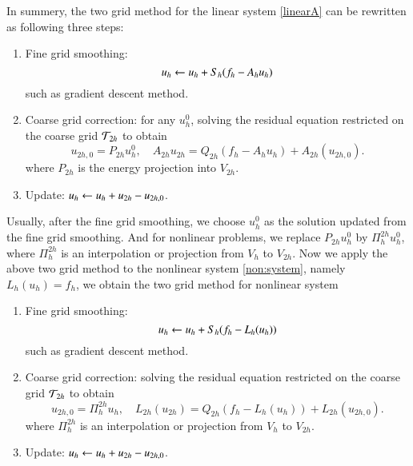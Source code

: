  In summery, the two grid method for the linear system \eqref{linearA} can be rewritten as following three steps:
\begin{enumerate}
\item Fine grid smoothing: 
$$
u_h\leftarrow u_h+S_h(f_h-A_hu_h)
$$
such as gradient descent method. 
\item Coarse grid correction: for any $u_h^0$, solving the residual equation restricted
on the coarse grid ${\cal T}_{2h}$ to obtain
$$
   u_{2h,0}=P_{2h} u_h^0, \quad     A_{2h}u_{2h}=Q_{2h}(f_h-A_h u_h)+A_{2h} (u_{2h,0}).
$$
where $P_{2h}$ is the energy projection %
into $V_{2h}$. 
\item Update: $u_h\leftarrow u_h+u_{2h}-u_{2h,0}$.
\end{enumerate}
Usually, after the fine grid smoothing, we choose $u_h^0$ as the solution updated from the fine grid smoothing.  And for nonlinear problems, we replace $P_{2h}u_h^0$ by $\Pi_h^{2h}u_h^0$, where $\Pi_h^{2h}$ is an interpolation or projection from $V_h$ to $V_{2h}$. 
Now we apply the above two grid method to the nonlinear system \eqref{non:system}, 
namely $L_{h}(u_h)=f_h$, we obtain the two grid method for nonlinear system
 \begin{enumerate}
\item Fine grid smoothing: 
$$
u_h\leftarrow u_h+S_h(f_h-L_h(u_h))
$$
such as gradient descent method. 
\item Coarse grid correction: solving the residual equation restricted
on the coarse grid ${\cal T}_{2h}$ to obtain
$$
   u_{2h,0}=\Pi_h^{2h} u_h, \quad     L_{2h}(u_{2h})=Q_{2h}(f_h-L_h (u_h))+L_{2h} (u_{2h,0}).
$$
where $\Pi_h^{2h}$ is an interpolation or projection from $V_h$ to $V_{2h}$. 
\item Update: $u_h\leftarrow u_h+u_{2h}-u_{2h,0}$. 
\end{enumerate}

